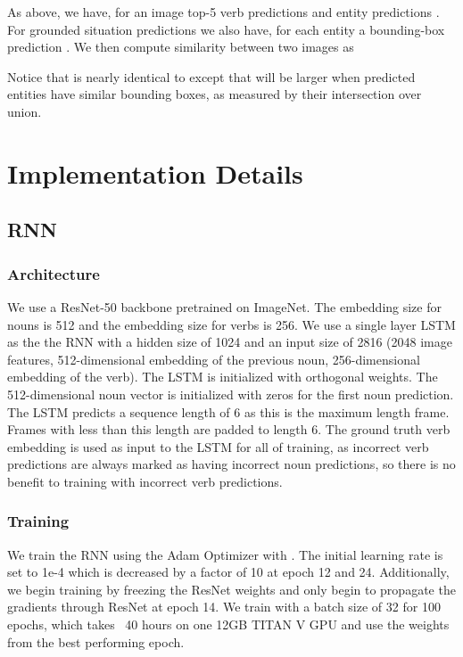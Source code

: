 \documentclass[runningheads]{llncs}
\begin{document}
As above, we have, for an image  top-5 verb predictions  and entity predictions . For grounded situation predictions we also have, for each entity  a bounding-box prediction . We then compute similarity between two images  as 

Notice that  is nearly identical to  except that  will be larger when predicted entities have similar bounding boxes, as measured by their intersection over union.

 \section{Implementation Details}
\label{sec:imp}
\subsection{RNN}
\subsubsection{Architecture}
We use a ResNet-50 backbone pretrained on ImageNet. The embedding size for nouns is 512 and the embedding size for verbs is 256. We use a single layer LSTM as the the RNN with a hidden size of 1024 and an input size of 2816 (2048 image features, 512-dimensional embedding of the previous noun, 256-dimensional embedding of the verb). The LSTM is initialized with orthogonal weights. The 512-dimensional noun vector is initialized with zeros for the first noun prediction. The LSTM predicts a sequence length of 6 as this is the maximum length frame. Frames with less than this length are padded to length 6. The ground truth verb embedding is used as input to the LSTM for all of training, as incorrect verb predictions are always marked as having incorrect noun predictions, so there is no benefit to training with incorrect verb predictions. 

\subsubsection{Training} We train the RNN using the Adam Optimizer \cite{KingmaAndBa2015} with . The initial learning rate is set to 1e-4 which is decreased by a factor of 10 at epoch 12 and 24. Additionally, we begin training by freezing the ResNet weights and only begin to propagate the gradients through ResNet at epoch 14. We train with a batch size of 32 for 100 epochs, which takes ~40 hours on one 12GB TITAN V GPU and use the weights from the best performing epoch. 
\end{document}
